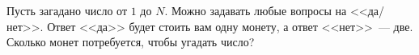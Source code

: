 Пусть загадано число от $1$ до $N$. Можно задавать любые вопросы на <<да/нет>>. Ответ <<да>> будет стоить
вам одну монету, а ответ <<нет>>~--- две. Сколько монет потребуется, чтобы угадать число?
